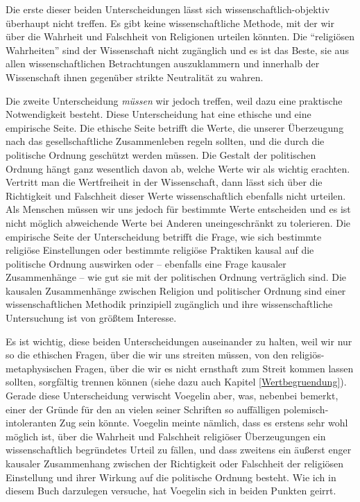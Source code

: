 Die erste dieser beiden Unterscheidungen lässt sich wissenschaftlich-objektiv
überhaupt nicht treffen. Es gibt keine wissenschaftliche Methode, mit der wir
über die Wahrheit und Falschheit von Religionen urteilen könnten. Die
``religiösen Wahrheiten'' sind der Wissenschaft nicht zugänglich und es ist
das Beste, sie aus allen wissenschaftlichen Betrachtungen auszuklammern und
innerhalb der Wissenschaft ihnen gegenüber strikte Neutralität zu wahren.

Die zweite Unterscheidung {\em müssen} wir jedoch treffen, weil dazu eine
praktische Notwendigkeit besteht. Diese Unterscheidung hat eine ethische und
eine empirische Seite. Die ethische Seite betrifft die Werte, die unserer
Überzeugung nach das gesellschaftliche Zusammenleben regeln sollten, und die
durch die politische Ordnung geschützt werden müssen. Die Gestalt der
politischen Ordnung hängt ganz wesentlich davon ab, welche Werte wir als
wichtig erachten.  Vertritt man die Wertfreiheit in der Wissenschaft, dann
lässt sich über die Richtigkeit und Falschheit dieser Werte wissenschaftlich
ebenfalls nicht urteilen. Als Menschen müssen wir uns jedoch für bestimmte
Werte entscheiden und es ist nicht möglich abweichende Werte bei Anderen
uneingeschränkt zu tolerieren. Die empirische Seite der Unterscheidung
betrifft die Frage, wie sich bestimmte religiöse Einstellungen oder bestimmte
religiöse Praktiken kausal auf die politische Ordnung auswirken oder --
ebenfalls eine Frage kausaler Zusammenhänge -- wie gut sie mit der politischen
Ordnung verträglich sind. Die kausalen Zusammenhänge zwischen Religion und
politischer Ordnung sind einer wissenschaftlichen Methodik prinzipiell
zugänglich und ihre wissenschaftliche Untersuchung ist von größtem Interesse.

Es ist wichtig, diese beiden Unterscheidungen auseinander zu halten, weil wir
nur so die ethischen Fragen, über die wir uns streiten müssen, von den
religiös-metaphysischen Fragen, über die wir es nicht ernsthaft zum Streit
kommen lassen sollten, sorgfältig trennen können (siehe dazu auch Kapitel
\ref{Wertbegruendung}). Gerade diese Unterscheidung verwischt Voegelin aber,
was, nebenbei bemerkt, einer der Gründe für den an vielen seiner Schriften so
auffälligen polemisch-intoleranten Zug sein könnte. Voegelin meinte nämlich,
dass es erstens sehr wohl möglich ist, über die Wahrheit und Falschheit
religiöser Überzeugungen ein wissenschaftlich begründetes Urteil zu fällen,
und dass zweitens ein äußerst enger kausaler Zusammenhang zwischen der
Richtigkeit oder Falschheit der religiösen Einstellung und ihrer Wirkung auf
die politische Ordnung besteht. Wie ich in diesem Buch darzulegen versuche,
hat Voegelin sich in beiden Punkten geirrt.

